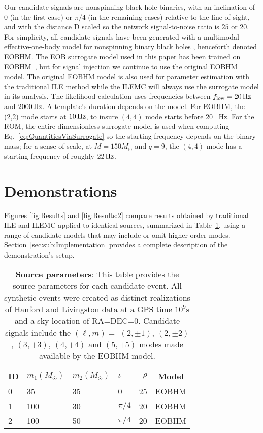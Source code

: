 \documentclass[aps,prd,nofootinbib,showpacs,amssymb,twocolumn]{revtex4}
\newcommand\unit[1]{\, {\rm #1}}
\begin{document}
Our candidate signals are nonspinning black hole binaries, with an inclination of $0$ (in the first case) or $\pi/4$
  (in the remaining cases) relative
to the line of sight, and with the distance D scaled so the network signal-to-noise ratio is $25$ or $20$. 
For simplicity, all candidate signals have been generated with a multimodal effective-one-body model
 for nonspinning binary black holes \cite{pan2011inspiral}, henceforth denoted EOBHM.  The EOB surrogate model used in this paper has been trained on EOBHM~\cite{2014PhRvX...4c1006F}, but for signal injection we continue to use the original EOBHM model. The original EOBHM model is also used for parameter estimation with the traditional ILE method while the ILEMC will always use the surrogate model in its analysis.
%
The likelihood calculation uses frequencies between   $f_{\rm low}=20\unit{Hz}$ and $2000\unit{Hz}$.
A template's 
%
duration depends on the model.  For EOBHM, the (2,2) mode starts
at $10\unit{Hz}$, to insure  $(4,4)$ mode starts 
%
before 20 \unit{Hz}.  For the ROM, the entire dimensionless
surrogate model is used when computing Eq.~\eqref{eq:QuantitiesViaSurrogate} so the starting frequency depends on the binary mass; for a sense of scale, at $M=150 M_\odot$ and $q=9$, the
$(4,4)$ mode has a starting frequency of roughly $22 \unit{Hz}$.
%
%
%
%
%





\section{Demonstrations}
\label{sec:Results}

Figures \ref{fig:Results} and \ref{fig:Results:2} compare results obtained by traditional ILE and ILEMC applied to identical sources, summarized in Table~\ref{tab:Parameters}, using a range of candidate models that may include or omit higher order modes. Section~\ref{sec:sub:Implementation} provides a complete description of the demonstration's setup.


\begin{table}
\begin{tabular}{l|lllr|c}
ID & $m_1 (M_\odot)$ & $m_2 (M_\odot)$ & $\iota$ & $\rho$ & Model\\ \hline
0  & 35 & 35 & 0 & 25  & EOBHM\\
1  & 100 & 30 & $\pi/4$ & 20  & EOBHM\\
2  & 100 & 50 & $\pi/4$ & 20  & EOBHM\\
\end{tabular}
\caption{\label{tab:Parameters}\textbf{Source parameters}: This table provides the source parameters for each candidate event. All synthetic events were created as distinct realizations of Hanford and Livingston data at a GPS time $10^9$s and a sky
  location of RA=DEC=0. Candidate signals include the $(\ell, m)=$ $(2, \pm 1)$, $(2, \pm 2)$, $(3, \pm 3)$, $(4,
    \pm 4)$ and $(5, \pm 5)$ modes made available by the EOBHM model.
%
%
}
\end{table}
\end{document}
